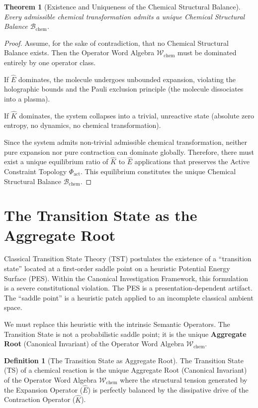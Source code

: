 \documentclass[11pt,openany]{extbook}
\theoremstyle{plain}
\newtheorem{theorem}{Theorem}[chapter]
\theoremstyle{definition}
\newtheorem{definition}{Definition}[chapter]
\begin{document}
\begin{theorem}[Existence and Uniqueness of the Chemical Structural Balance]
Every admissible chemical transformation admits a unique Chemical Structural Balance $\mathcal{B}_{\text{chem}}$.
\end{theorem}
\begin{proof}
Assume, for the sake of contradiction, that no Chemical Structural Balance exists. Then the Operator Word Algebra $\mathcal{W}_{\text{chem}}$ must be dominated entirely by one operator class. 

If $\hat{E}$ dominates, the molecule undergoes unbounded expansion, violating the holographic bounds and the Pauli exclusion principle (the molecule dissociates into a plasma). 

If $\hat{K}$ dominates, the system collapses into a trivial, unreactive state (absolute zero entropy, no dynamics, no chemical transformation).

Since the system admits non-trivial admissible chemical transformation, neither pure expansion nor pure contraction can dominate globally. Therefore, there must exist a unique equilibrium ratio of $\hat{K}$ to $\hat{E}$ applications that preserves the Active Constraint Topology $\Phi_{\text{act}}$. This equilibrium constitutes the unique Chemical Structural Balance $\mathcal{B}_{\text{chem}}$.
\end{proof}

\section{The Transition State as the Aggregate Root}

Classical Transition State Theory (TST) postulates the existence of a ``transition state'' located at a first-order saddle point on a heuristic Potential Energy Surface (PES). Within the Canonical Investigation Framework, this formulation is a severe constitutional violation. The PES is a presentation-dependent artifact. The ``saddle point'' is a heuristic patch applied to an incomplete classical ambient space.

We must replace this heuristic with the intrinsic Semantic Operators. The Transition State is not a probabilistic saddle point; it is the unique \textbf{Aggregate Root} (Canonical Invariant) of the Operator Word Algebra $\mathcal{W}_{\text{chem}}$.

\begin{definition}[The Transition State as Aggregate Root]
The Transition State (TS) of a chemical reaction is the unique Aggregate Root (Canonical Invariant) of the Operator Word Algebra $\mathcal{W}_{\text{chem}}$ where the structural tension generated by the Expansion Operator ($\hat{E}$) is perfectly balanced by the dissipative drive of the Contraction Operator ($\hat{K}$).
\end{definition}
\end{document}
